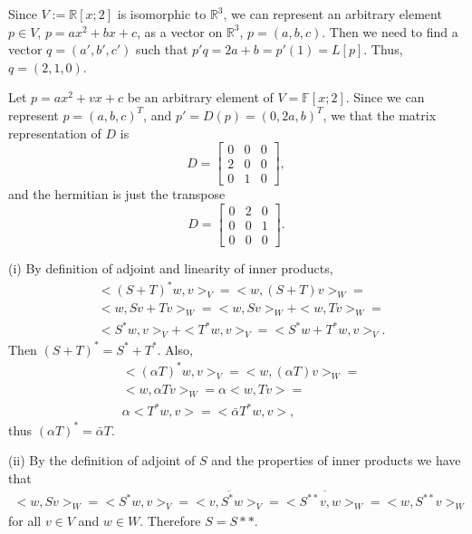 \documentclass[letterpaper,12pt]{article}
\theoremstyle{definition}
\newenvironment{problem}[2][Problem]{\begin{trivlist}
\item[\hskip \labelsep {\bfseries #1}\hskip \labelsep {\bfseries #2.}]}{\end{trivlist}}
\begin{document}
\begin{problem}{30}
\end{problem} \begin{problem}{37}
Since $V:=\mathbb R[x; 2]$ is isomorphic to $\mathbb R^3$,
we can represent an arbitrary element $p\in V$, $p=ax^2+bx+c$,
as a vector on $\mathbb R^3$, $p=(a, b, c)$.
Then we need to find a vector $q=(a', b', c')$ such that
$p'q=2a+b=p'(1)=L[p]$.
Thus, $q=(2, 1, 0)$.

\end{problem} \begin{problem}{38}
Let $p=ax^2+vx+c$ be an arbitrary element of $V=\mathbb F[x;2]$.
Since we can represent $p=(a, b, c)^T$, and $p'=D(p)=(0,2a,b)^T$,
we that the matrix representation of $D$ is
\begin{equation*}
    D = \begin{bmatrix}
        0 & 0 & 0\\
        2 & 0 & 0\\
        0 & 1 & 0
    \end{bmatrix},
\end{equation*}
and the hermitian is just the transpose
\begin{equation*}
    D = \begin{bmatrix}
        0 & 2 & 0\\
        0 & 0 & 1\\
        0 & 0 & 0
    \end{bmatrix}.
\end{equation*}

\end{problem} \begin{problem}{39}
(i)
By definition of adjoint and linearity of inner products,
\begin{align*}
    &<(S+T)^*w,v>_V=
    <w,(S+T)v>_W=\\
    &<w,Sv+Tv>_W=
    <w,Sv>_W+<w,Tv>_W=\\
    &<S^*w,v>_V + <T^*w,v>_V=
    <S^*w+T^*w,v>_V.
\end{align*}
Then $(S+T)^*=S^*+T^*$.
Also,
\begin{align*}
    &<(\alpha T)^*w,v>_V=
    <w,(\alpha T)v>_W=\\
    &<w,\alpha Tv>_W=
    \alpha<w, Tv>=\\
    &\alpha<T^*w,v>=
    <\bar{\alpha}T^*w,v>,
\end{align*}
thus $(\alpha T)^*=\bar{\alpha}T$.

(ii)
By the definition of adjoint of $S$ and the properties of inner products we have that
\begin{align*}
    <w,Sv>_W=<S^*w,v>_V=
    \overline{<v,S^*w>_V}=\overline{<S^{**}v,w>_W}=
    <w,S^{**}v>_W
\end{align*}
for all $v\in V$ and $w\in W$.
Therefore $S=S**$.


\end{problem}
\end{document}
